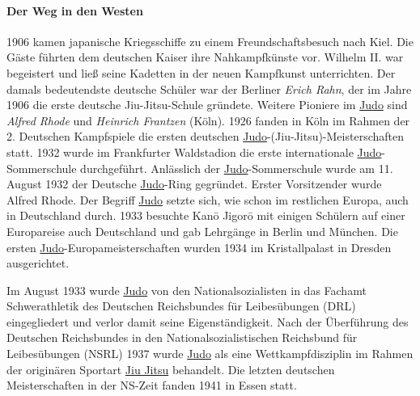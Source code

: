 \documentclass[justified, a4paper, notitlepage, captions=tableheading, nobib]{tufte-handout}
\begin{document}
\paragraph{Der Weg in den Westen}
\label{sec:orgb7fc8e6}
1906 kamen japanische Kriegsschiffe zu einem Freundschaftsbesuch nach Kiel. Die Gäste führten dem deutschen Kaiser ihre Nahkampfkünste vor. Wilhelm II. war begeistert und ließ seine Kadetten in der neuen Kampfkunst unterrichten. Der damals bedeutendste deutsche Schüler war der Berliner \emph{Erich Rahn}, der im Jahre 1906 die erste deutsche Jiu-Jitsu-Schule gründete. Weitere Pioniere im \hyperref[org4f88021]{Judo} sind \emph{Alfred Rhode} und \emph{Heinrich Frantzen} (Köln). 1926 fanden in Köln im Rahmen der 2. Deutschen Kampfspiele die ersten deutschen \hyperref[org4f88021]{Judo}-(Jiu-Jitsu)-Meisterschaften statt. 1932 wurde im Frankfurter Waldstadion die erste internationale \hyperref[org4f88021]{Judo}-Sommerschule durchgeführt. Anlässlich der \hyperref[org4f88021]{Judo}-Sommerschule wurde am 11. August 1932 der Deutsche \hyperref[org4f88021]{Judo}-Ring gegründet. Erster Vorsitzender wurde Alfred Rhode. Der Begriff \hyperref[org4f88021]{Judo} setzte sich, wie schon im restlichen Europa, auch in Deutschland durch. 1933 besuchte Kanō Jigorō mit einigen Schülern auf einer Europareise auch Deutschland und gab Lehrgänge in Berlin und München. Die ersten \hyperref[org4f88021]{Judo}-Europameisterschaften wurden 1934 im Kristallpalast in Dresden ausgerichtet.

Im August 1933 wurde \hyperref[org4f88021]{Judo} von den Nationalsozialisten in das Fachamt Schwerathletik des Deutschen Reichsbundes für Leibesübungen (DRL) eingegliedert und verlor damit seine Eigenständigkeit. Nach der Überführung des Deutschen Reichsbundes in den Nationalsozialistischen Reichsbund für Leibesübungen (NSRL) 1937 wurde \hyperref[org4f88021]{Judo} als eine Wettkampfdisziplin im Rahmen der originären Sportart \hyperref[org74d5825]{Jiu Jitsu} behandelt. Die letzten deutschen Meisterschaften in der NS-Zeit fanden 1941 in Essen statt.
\end{document}
